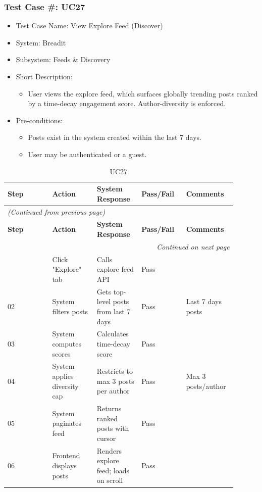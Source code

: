 \subsubsection{Test Case \#: UC27}
\begin{itemize}
  \item Test Case Name: View Explore Feed (Discover)
  \item System: Breadit
  \item Subsystem: Feeds \& Discovery
  \item Short Description:
\begin{itemize}
  \item User views the explore feed, which surfaces globally trending posts ranked by a time-decay engagement score. Author-diversity is enforced.
\end{itemize}
  \item Pre-conditions:
\begin{itemize}
  \item Posts exist in the system created within the last 7 days.
  \item User may be authenticated or a guest.
\end{itemize}
\end{itemize}

\begin{longtable}{|p{0.18\linewidth}|p{0.18\linewidth}|p{0.18\linewidth}|p{0.18\linewidth}|p{0.18\linewidth}|}
\caption{UC27} \label{tab:30} \\
\hline
\textbf{Step} & \textbf{Action} & \textbf{System Response} & \textbf{Pass/Fail} & \textbf{Comments} \\
\hline
\endfirsthead
\multicolumn{5}{l}{\textit{(Continued from previous page)}} \\
\hline
\textbf{Step} & \textbf{Action} & \textbf{System Response} & \textbf{Pass/Fail} & \textbf{Comments} \\
\hline
\endhead
\hline \multicolumn{5}{r}{\textit{Continued on next page}} \\
\endfoot
\hline
\endlastfoot
01 & Click "Explore" tab & Calls explore feed API & Pass &  \\
\hline
02 & System filters posts & Gets top-level posts from last 7 days & Pass & Last 7 days posts \\
\hline
03 & System computes scores & Calculates time-decay score & Pass &  \\
\hline
04 & System applies diversity cap & Restricts to max 3 posts per author & Pass & Max 3 posts/author \\
\hline
05 & System paginates feed & Returns ranked posts with cursor & Pass &  \\
\hline
06 & Frontend displays posts & Renders explore feed; loads on scroll & Pass &  \\
\hline
\end{longtable}

